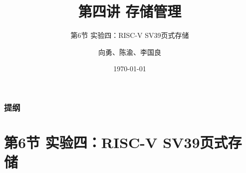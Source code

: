 


\title[第4讲]{第四讲 存储管理} %
\subtitle{第6节 实验四：RISC-V SV39页式存储}
\author{向勇、陈渝、李国良} %
\date{\today} %



\begin{frame}
\titlepage %
\end{frame}

\begin{frame}
\frametitle{提纲} %
\tableofcontents %
\end{frame}

\section{第6节 实验四：RISC-V SV39页式存储}%
